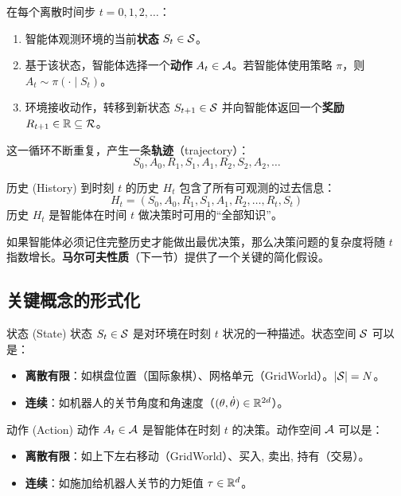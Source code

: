 在每个离散时间步 $t = 0, 1, 2, \dots$：
\begin{enumerate}
    \item 智能体观测环境的当前\textbf{状态} $S_t \in \mathcal{S}$。
    \item 基于该状态，智能体选择一个\textbf{动作} $A_t \in \mathcal{A}$。若智能体使用策略 $\pi$，则 $A_t \sim \pi(\cdot \mid S_t)$。
    \item 环境接收动作，转移到新状态 $S_{t+1} \in \mathcal{S}$ 并向智能体返回一个\textbf{奖励} $R_{t+1} \in \mathbb{R} \subseteq \mathcal{R}$。
\end{enumerate}
这一循环不断重复，产生一条\textbf{轨迹}（trajectory）：
\[
S_0, A_0, R_1, S_1, A_1, R_2, S_2, A_2, \dots
\]

\begin{mydefinition}{历史 (History)}
到时刻 $t$ 的历史 $H_t$ 包含了所有可观测的过去信息：
\[
H_t = (S_0, A_0, R_1, S_1, A_1, R_2, \dots, R_t, S_t)
\]
历史 $H_t$ 是智能体在时间 $t$ 做决策时可用的``全部知识''。
\end{mydefinition}

如果智能体必须记住完整历史才能做出最优决策，那么决策问题的复杂度将随 $t$ 指数增长。\textbf{马尔可夫性质}（下一节）提供了一个关键的简化假设。

\subsection{关键概念的形式化}

\begin{mydefinition}{状态 (State)}
状态 $S_t \in \mathcal{S}$ 是对环境在时刻 $t$ 状况的一种描述。状态空间 $\mathcal{S}$ 可以是：
\begin{itemize}
    \item \textbf{离散有限}：如棋盘位置（国际象棋）、网格单元（GridWorld）。$|\mathcal{S}| = N$。
    \item \textbf{连续}：如机器人的关节角度和角速度（$(\theta, \dot{\theta}) \in \mathbb{R}^{2d}$）。
\end{itemize}
\end{mydefinition}

\begin{mydefinition}{动作 (Action)}
动作 $A_t \in \mathcal{A}$ 是智能体在时刻 $t$ 的决策。动作空间 $\mathcal{A}$ 可以是：
\begin{itemize}
    \item \textbf{离散有限}：如上下左右移动（GridWorld）、{买入, 卖出, 持有}（交易）。
    \item \textbf{连续}：如施加给机器人关节的力矩值 $\tau \in \mathbb{R}^d$。
\end{itemize}
\end{mydefinition}

